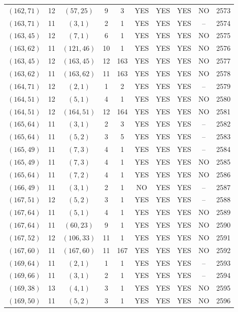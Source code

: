 \begin{longtable}{|c|c|c|c|c|c|c|c|c|c|}
$(162, 71)$ & 12 & $(57, 25)$ & 9 & 3 & YES & YES & YES & NO & 2573\\
$(163, 71)$ & 11 & $(3, 1)$ & 2 & 1 & YES & YES & YES & -- & 2574\\
$(163, 45)$ & 12 & $(7, 1)$ & 6 & 1 & YES & YES & YES & NO & 2575\\
$(163, 62)$ & 11 & $(121, 46)$ & 10 & 1 & YES & YES & YES & NO & 2576\\
$(163, 45)$ & 12 & $(163, 45)$ & 12 & 163 & YES & YES & YES & NO & 2577\\
$(163, 62)$ & 11 & $(163, 62)$ & 11 & 163 & YES & YES & YES & NO & 2578\\
$(164, 71)$ & 12 & $(2, 1)$ & 1 & 2 & YES & YES & YES & -- & 2579\\
$(164, 51)$ & 12 & $(5, 1)$ & 4 & 1 & YES & YES & YES & NO & 2580\\
$(164, 51)$ & 12 & $(164, 51)$ & 12 & 164 & YES & YES & YES & NO & 2581\\
$(165, 64)$ & 11 & $(3, 1)$ & 2 & 3 & YES & YES & YES & -- & 2582\\
$(165, 64)$ & 11 & $(5, 2)$ & 3 & 5 & YES & YES & YES & -- & 2583\\
$(165, 49)$ & 11 & $(7, 3)$ & 4 & 1 & YES & YES & YES & -- & 2584\\
$(165, 49)$ & 11 & $(7, 3)$ & 4 & 1 & YES & YES & YES & NO & 2585\\
$(165, 64)$ & 11 & $(7, 2)$ & 4 & 1 & YES & YES & YES & NO & 2586\\
$(166, 49)$ & 11 & $(3, 1)$ & 2 & 1 & NO & YES & YES & -- & 2587\\
$(167, 51)$ & 12 & $(5, 2)$ & 3 & 1 & YES & YES & YES & -- & 2588\\
$(167, 64)$ & 11 & $(5, 1)$ & 4 & 1 & YES & YES & YES & NO & 2589\\
$(167, 64)$ & 11 & $(60, 23)$ & 9 & 1 & YES & YES & YES & NO & 2590\\
$(167, 52)$ & 12 & $(106, 33)$ & 11 & 1 & YES & YES & YES & NO & 2591\\
$(167, 60)$ & 11 & $(167, 60)$ & 11 & 167 & YES & YES & YES & NO & 2592\\
$(169, 64)$ & 11 & $(2, 1)$ & 1 & 1 & YES & YES & YES & -- & 2593\\
$(169, 66)$ & 11 & $(3, 1)$ & 2 & 1 & YES & YES & YES & -- & 2594\\
$(169, 38)$ & 13 & $(4, 1)$ & 3 & 1 & YES & YES & YES & NO & 2595\\
$(169, 50)$ & 11 & $(5, 2)$ & 3 & 1 & YES & YES & YES & NO & 2596\\

\end{longtable}
